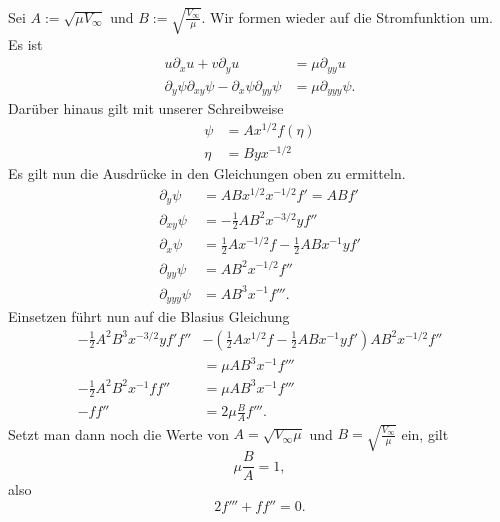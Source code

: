 \documentclass[12pt]{exam}
\newcommand{\del}{\partial}
\begin{document}
\begin{questions}
    \begin{solution}
        Sei $A := \sqrt{\mu V_{\infty}}$ und $B := \sqrt{\frac{V_{\infty}}{\mu}}$. Wir formen wieder auf die Stromfunktion um. Es ist
        \begin{align*}
            u \del_x u + v \del_y u &= \mu \del_{yy} u \\
            \del_y \psi \del_{xy} \psi - \del_x \psi \del_{yy} \psi &= \mu \del_{yyy} \psi.
        \end{align*}
        Darüber hinaus gilt mit unserer Schreibweise 
        \begin{align*}
            \psi &= A x^{1/2} f(\eta) \\
            \eta &= B y x^{-1/2}
        \end{align*}
        Es gilt nun die Ausdrücke in den Gleichungen oben zu ermitteln.
        \begin{align*}
            \del_y \psi  &= A B x^{1/2} x^{-1/2} f' = A B f' \\
            \del_{xy} \psi &= -\frac{1}{2} A B^2 x^{-3/2} y f'' \\
            \del_x \psi &= \frac{1}{2} A x^{-1/2} f - \frac{1}{2} A B x^{-1} y f' \\
            \del_{yy} \psi &= A B^2 x^{-1/2} f'' \\
            \del_{yyy} \psi &= A B^3 x^{-1} f'''.
        \end{align*}
        Einsetzen führt nun auf die Blasius Gleichung
        \begin{align*}
            -\frac{1}{2} A^2 B^3 x^{-3/2} y f' f'' &- \left( \frac{1}{2} A x^{1/2} f - \frac{1}{2} A B x^{-1} y f' \right) A B^2 x^{-1/2} f'' \\
            &= \mu A B^3 x^{-1} f''' \\
            -\frac{1}{2} A^2 B^2 x^{-1} f f'' &= \mu A B^3 x^{-1} f''' \\
            -f f'' &= 2 \mu \frac{B}{A} f'''.
        \end{align*}
        Setzt man dann noch die Werte von $A = \sqrt{V_{\infty} \mu}$ und $B = \sqrt{\frac{V_{\infty}}{\mu}}$ ein, gilt
        \begin{equation*}
            \mu \frac{B}{A} = 1,
        \end{equation*}
        also
        \begin{equation*}
            2 f''' + f f'' = 0.
        \end{equation*}
    \end{solution}
    

\end{questions}
\end{document}

